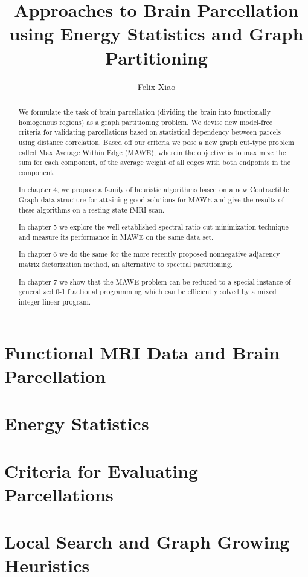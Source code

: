 \documentclass{report}
\title{Approaches to Brain Parcellation using Energy Statistics and Graph Partitioning}
\author{Felix Xiao}
\begin{document}
\maketitle
\tableofcontents

\begin{abstract}
We formulate the task of brain parcellation (dividing the
brain into functionally homogenous regions) as a graph
partitioning problem. We devise new model-free criteria
for validating parcellations based on statistical
dependency between parcels using distance correlation.
Based off our criteria we pose a new graph cut-type
problem called Max Average Within Edge (MAWE), wherein the
objective is to maximize the sum for each component, of
the average weight of all edges with both endpoints in the
component.

In chapter 4, we propose a family of heuristic algorithms
based on a new Contractible Graph data structure for
attaining good solutions for MAWE and give the results
of these algorithms on a resting state fMRI scan.

In chapter 5 we explore the well-established spectral
ratio-cut minimization technique and measure its
performance in MAWE on the same data set.

In chapter 6 we do the same for the more recently proposed
nonnegative adjacency matrix factorization method,
an alternative to spectral partitioning.

In chapter 7 we show that the MAWE problem can be
reduced to a special instance of generalized 0-1
fractional programming which can be efficiently solved by
a mixed integer linear program.
\end{abstract}

\chapter{Functional MRI Data and Brain Parcellation}


\chapter{Energy Statistics}


\chapter{Criteria for Evaluating Parcellations}


\chapter{Local Search and Graph Growing Heuristics}

\end{document}
